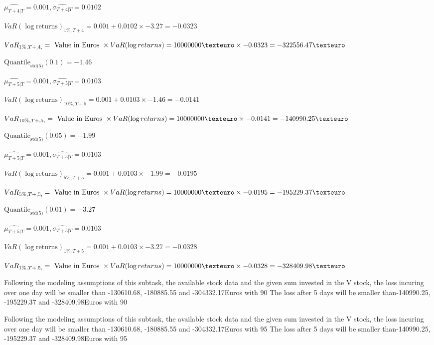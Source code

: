 $\hat{\mu_{T+4|T}} = 0.001, \hat{\sigma_{T+4|T}} = 0.0102$

$VaR(\log \text{returns})_{1\%, T + 4} = 0.001 + 0.0102\times-3.27 = -0.0323$

$VaR_{1\%, T + ,4,} = \text{ Value in Euros } \times VaR(\log returns) = 10 000 000 \texteuro \times-0.0323 = -322556.47 \texteuro$


$\text{Quantile}_\text{std(5)}(0.1) = -1.46$

$\hat{\mu_{T+5|T}} = 0.001, \hat{\sigma_{T+5|T}} = 0.0103$

$VaR(\log \text{returns})_{10\%, T + 5} = 0.001 + 0.0103\times-1.46 = -0.0141$

$VaR_{10\%, T + ,5,} = \text{ Value in Euros } \times VaR(\log returns) = 10 000 000 \texteuro \times-0.0141 = -140990.25 \texteuro$


$\text{Quantile}_\text{std(5)}(0.05) = -1.99$

$\hat{\mu_{T+5|T}} = 0.001, \hat{\sigma_{T+5|T}} = 0.0103$

$VaR(\log \text{returns})_{5\%, T + 5} = 0.001 + 0.0103\times-1.99 = -0.0195$

$VaR_{5\%, T + ,5,} = \text{ Value in Euros } \times VaR(\log returns) = 10 000 000 \texteuro \times-0.0195 = -195229.37 \texteuro$


$\text{Quantile}_\text{std(5)}(0.01) = -3.27$

$\hat{\mu_{T+5|T}} = 0.001, \hat{\sigma_{T+5|T}} = 0.0103$

$VaR(\log \text{returns})_{1\%, T + 5} = 0.001 + 0.0103\times-3.27 = -0.0328$

$VaR_{1\%, T + ,5,} = \text{ Value in Euros } \times VaR(\log returns) = 10 000 000 \texteuro \times-0.0328 = -328409.98 \texteuro$


Following the modeling assumptions of this subtask, the available stock data and the given sum invested in the V stock, the loss incuring over one day will be smaller than -130610.68, -180885.55 and -304332.17Euros with 90%
The loss after 5 days will be smaller than-140990.25, -195229.37 and -328409.98Euros with 90%



Following the modeling assumptions of this subtask, the available stock data and the given sum invested in the V stock, the loss incuring over one day will be smaller than -130610.68, -180885.55 and -304332.17Euros with 95%
The loss after 5 days will be smaller than-140990.25, -195229.37 and -328409.98Euros with 95%



